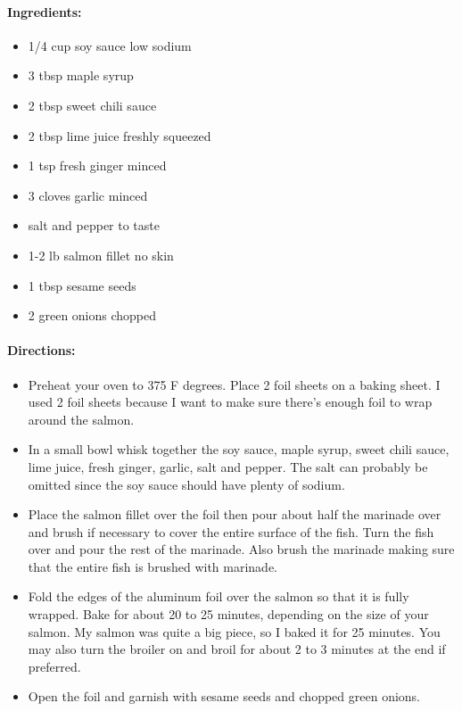 \documentclass{article}
\begin{document}
\paragraph{Ingredients:}
\begin{itemize}
    \item 1/4 cup soy sauce low sodium
    \item 3 tbsp maple syrup
    \item 2 tbsp sweet chili sauce
    \item 2 tbsp lime juice freshly squeezed
    \item 1 tsp fresh ginger minced
    \item 3 cloves garlic minced
    \item salt and pepper to taste
    \item 1-2 lb salmon fillet no skin
    \item 1 tbsp sesame seeds
    \item 2 green onions chopped
\end{itemize}

\paragraph{Directions:}
\begin{itemize}
    \item Preheat your oven to 375 F degrees. Place 2 foil sheets on a baking sheet. I used 2 foil sheets because I want to make sure there’s enough foil to wrap around the salmon.
    \item In a small bowl whisk together the soy sauce, maple syrup, sweet chili sauce, lime juice, fresh ginger, garlic, salt and pepper. The salt can probably be omitted since the soy sauce should have plenty of sodium.
    \item Place the salmon fillet over the foil then pour about half the marinade over and brush if necessary to cover the entire surface of the fish. Turn the fish over and pour the rest of the marinade. Also brush the marinade making sure that the entire fish is brushed with marinade.
    \item Fold the edges of the aluminum foil over the salmon so that it is fully wrapped. Bake for about 20 to 25 minutes, depending on the size of your salmon. My salmon was quite a big piece, so I baked it for 25 minutes. You may also turn the broiler on and broil for about 2 to 3 minutes at the end if preferred.
    \item Open the foil and garnish with sesame seeds and chopped green onions.
\end{itemize}
\end{document}
